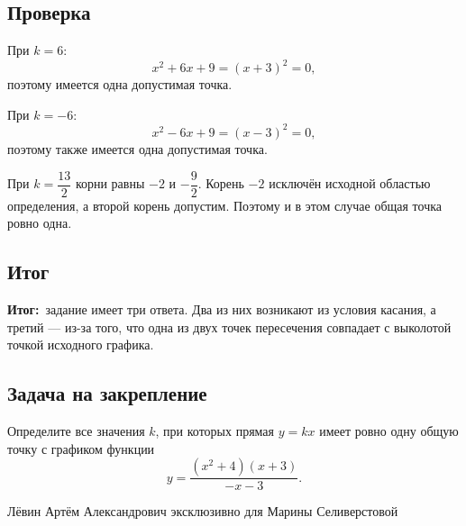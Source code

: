 \documentclass[12pt,a4paper]{article}
\newcommand{\resultlabel}{\textcolor{teal!60!black}{\textbf{Итог:}}}
\begin{document}
\subsection*{Проверка}
При $k=6$:
\[
x^2+6x+9=(x+3)^2=0,
\]
поэтому имеется одна допустимая точка.

При $k=-6$:
\[
x^2-6x+9=(x-3)^2=0,
\]
поэтому также имеется одна допустимая точка.

При $k=\dfrac{13}{2}$ корни равны $-2$ и $-\dfrac92$. Корень $-2$ исключён исходной областью определения, а второй корень допустим. Поэтому и в этом случае общая точка ровно одна.

\subsection*{Итог}
\resultlabel\ задание имеет три ответа. Два из них возникают из условия касания, а третий --- из-за того, что одна из двух точек пересечения совпадает с выколотой точкой исходного графика.

\subsection*{Задача на закрепление}
Определите все значения $k$, при которых прямая $y=kx$ имеет ровно одну общую точку с графиком функции
\[
y=\frac{(x^2+4)(x+3)}{-x-3}.
\]

\vfill
\begin{center}
\small Лёвин Артём Александрович эксклюзивно для Марины Селиверстовой
\end{center}
\end{document}
